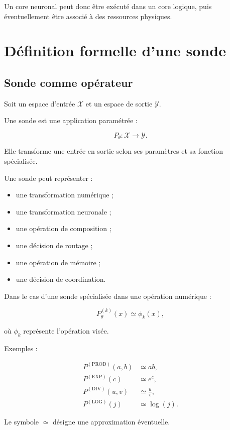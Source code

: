 \documentclass[11pt,a4paper]{article}
\begin{document}
Un core neuronal peut donc être exécuté dans un core logique,
puis éventuellement être associé à des ressources physiques.

\section{Définition formelle d'une sonde}

\subsection{Sonde comme opérateur}

Soit un espace d'entrée $\mathcal{X}$ et un espace de sortie
$\mathcal{Y}$.

Une sonde est une application paramétrée :

\[
P_{\theta} :
\mathcal{X}
\rightarrow
\mathcal{Y}.
\]

Elle transforme une entrée en sortie selon ses paramètres
et sa fonction spécialisée.

Une sonde peut représenter :
\begin{itemize}
  \item une transformation numérique ;
  \item une transformation neuronale ;
  \item une opération de composition ;
  \item une décision de routage ;
  \item une opération de mémoire ;
  \item une décision de coordination.
\end{itemize}

Dans le cas d'une sonde spécialisée dans une opération numérique :

\[
P_{\theta}^{(k)}(x)
\simeq
\phi_k(x),
\]

où $\phi_k$ représente l'opération visée.

Exemples :

\[
\begin{aligned}
P^{(\mathrm{PROD})}(a,b) &\simeq ab,\\
P^{(\mathrm{EXP})}(c) &\simeq e^c,\\
P^{(\mathrm{DIV})}(u,v) &\simeq \frac{u}{v},\\
P^{(\mathrm{LOG})}(j) &\simeq \log(j).
\end{aligned}
\]

Le symbole $\simeq$ désigne une approximation éventuelle.
\end{document}
